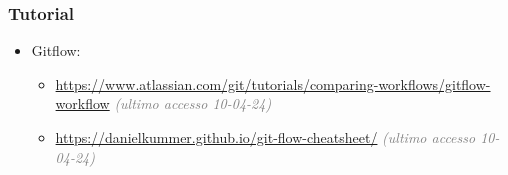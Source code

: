 \subsubsection{Tutorial}
\begin{itemize}
        \item Gitflow:
            \begin{itemize}
                \item \url{https://www.atlassian.com/git/tutorials/comparing-workflows/gitflow-workflow} \textcolor{gray}{\textit{(ultimo accesso 10-04-24)}}
                \item \url{https://danielkummer.github.io/git-flow-cheatsheet/} \textcolor{gray}{\textit{(ultimo accesso 10-04-24)}}
            \end{itemize}       
                        
    \end{itemize}